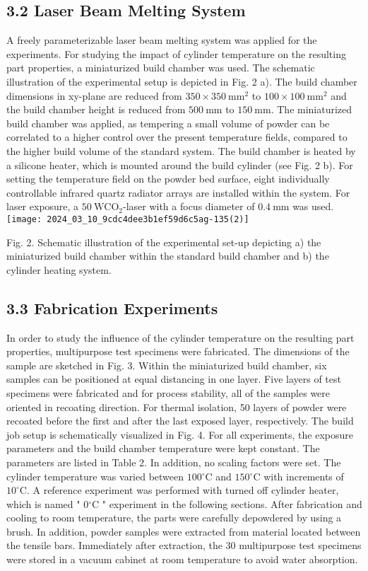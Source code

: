 \documentclass[10pt]{article}
\begin{document}
\subsection*{3.2 Laser Beam Melting System}
A freely parameterizable laser beam melting system was applied for the experiments. For studying the impact of cylinder temperature on the resulting part properties, a miniaturized build chamber was used. The schematic illustration of the experimental setup is depicted in Fig. 2 a). The build chamber dimensions in xy-plane are reduced from $350 \times 350 \mathrm{~mm}^{2}$ to $100 \times 100 \mathrm{~mm}^{2}$ and the build chamber height is reduced from $500 \mathrm{~mm}$ to $150 \mathrm{~mm}$. The miniaturized build chamber was applied, as tempering a small volume of powder can be correlated to a higher control over the present temperature fields, compared to the higher build volume of the standard system. The build chamber is heated by a silicone heater, which is mounted around the build cylinder (see Fig. 2 b). For setting the temperature field on the powder bed surface, eight individually controllable infrared quartz radiator arrays are installed within the system. For laser exposure, a $50 \mathrm{~W} \mathrm{CO}_{2}$-laser with a focus diameter of $0.4 \mathrm{~mm}$ was used.\\
\texttt{[image: 2024\_03\_10\_9cdc4dee3b1ef59d6c5ag-135(2)]}

Fig. 2. Schematic illustration of the experimental set-up depicting a) the miniaturized build chamber within the standard build chamber and b) the cylinder heating system.

\subsection*{3.3 Fabrication Experiments}
In order to study the influence of the cylinder temperature on the resulting part properties, multipurpose test specimens were fabricated. The dimensions of the sample are sketched in Fig. 3. Within the miniaturized build chamber, six samples can be positioned at equal distancing in one layer. Five layers of test specimens were fabricated and for process stability, all of the samples were oriented in recoating direction. For thermal isolation, 50 layers of powder were recoated before the first and after the last exposed layer, respectively. The build job setup is schematically visualized in Fig. 4. For all experiments, the exposure parameters and the build chamber temperature were kept constant. The parameters are listed in Table 2. In addition, no scaling factors were set. The cylinder temperature was varied between $100{ }^{\circ} \mathrm{C}$ and $150{ }^{\circ} \mathrm{C}$ with increments of $10^{\circ} \mathrm{C}$. A reference experiment was performed with turned off cylinder heater, which is named " $0{ }^{\circ} \mathrm{C}$ " experiment in the following sections. After fabrication and cooling to room temperature, the parts were carefully depowdered by using a brush. In addition, powder samples were extracted from material located between the tensile bars. Immediately after extraction, the 30 multipurpose test specimens were stored in a vacuum cabinet at room temperature to avoid water absorption.
\end{document}

